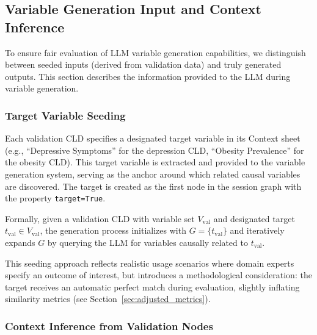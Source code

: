 
\subsection{Variable Generation Input and Context Inference}

To ensure fair evaluation of LLM variable generation capabilities, we distinguish between seeded inputs (derived from validation data) and truly generated outputs. This section describes the information provided to the LLM during variable generation.

\subsubsection{Target Variable Seeding}

Each validation CLD specifies a designated target variable in its Context sheet (e.g., ``Depressive Symptoms'' for the depression CLD, ``Obesity Prevalence'' for the obesity CLD). This target variable is extracted and provided to the variable generation system, serving as the anchor around which related causal variables are discovered. The target is created as the first node in the session graph with the property \texttt{target=True}.

Formally, given a validation CLD with variable set \(V_{\text{val}}\) and designated target \(t_{\text{val}} \in V_{\text{val}}\), the generation process initializes with \(G = \{t_{\text{val}}\}\) and iteratively expands \(G\) by querying the LLM for variables causally related to \(t_{\text{val}}\).

This seeding approach reflects realistic usage scenarios where domain experts specify an outcome of interest, but introduces a methodological consideration: the target receives an automatic perfect match during evaluation, slightly inflating similarity metrics (see Section~\ref{sec:adjusted_metrics}).

\subsubsection{Context Inference from Validation Nodes}

